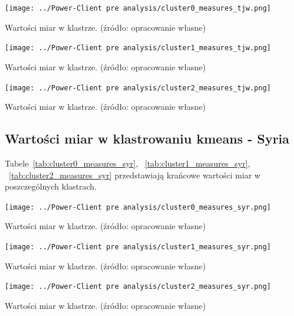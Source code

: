 \documentclass[11pt]{report}
\begin{document}
    \begin{table}[!htp]
        \centering
        \texttt{[image: ../Power-Client pre analysis/cluster0\_measures\_tjw.png]}
        \caption{Wartości miar w klastrze. (źródło: opracowanie własne)}
        \label{tab:cluster0_measures_tjw}
    \end{table}
    \begin{table}[!htp]
        \centering
        \texttt{[image: ../Power-Client pre analysis/cluster1\_measures\_tjw.png]}
        \caption{Wartości miar w klastrze. (źródło: opracowanie własne)}
        \label{tab:cluster1_measures_tjw}
    \end{table}
    \begin{table}[!htp]
        \centering
        \texttt{[image: ../Power-Client pre analysis/cluster2\_measures\_tjw.png]}
        \caption{Wartości miar w klastrze. (źródło: opracowanie własne)}
        \label{tab:cluster2_measures_tjw}
    \end{table}

    \subsection{Wartości miar w klastrowaniu kmeans - Syria}\label{subsec:wartości-miar-w-klastrowaniu-kmeans---syria}

    Tabele~\ref{tab:cluster0_measures_syr},
    ~\ref{tab:cluster1_measures_syr},
    ~\ref{tab:cluster2_measures_syr}
    przedstawiają krańcowe wartości miar w poszczególnych klastrach.

    \begin{table}[!htp]
        \centering
        \texttt{[image: ../Power-Client pre analysis/cluster0\_measures\_syr.png]}
        \caption{Wartości miar w klastrze. (źródło: opracowanie własne)}
        \label{tab:cluster0_measures_syr}
    \end{table}
    \begin{table}[!htp]
        \centering
        \texttt{[image: ../Power-Client pre analysis/cluster1\_measures\_syr.png]}
        \caption{Wartości miar w klastrze. (źródło: opracowanie własne)}
        \label{tab:cluster1_measures_syr}
    \end{table}
    \begin{table}[!htp]
        \centering
        \texttt{[image: ../Power-Client pre analysis/cluster2\_measures\_syr.png]}
        \caption{Wartości miar w klastrze. (źródło: opracowanie własne)}
        \label{tab:cluster2_measures_syr}
    \end{table}
\end{document}
